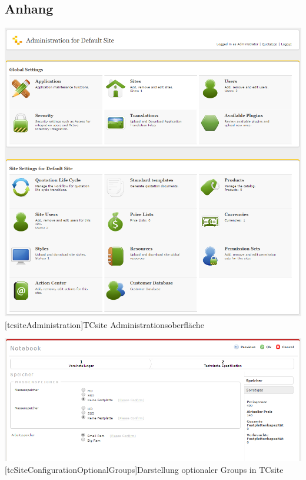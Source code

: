 
\renewcommand\refname{Anhang}
\begin{appendix}
\section{Anhang}

\vspace{1em}
\begin{minipage}{\linewidth}
	\centering
	\includegraphics[width=1\linewidth]{Abbildungen/tcsiteAdministration.PNG}
	[tcsiteAdministration]{TCsite Administrationsoberfläche}
	\label{app:tcsiteAdministration}
\end{minipage}
\vspace{1em}

\vspace{1em}
\begin{minipage}{\linewidth}
	\centering
	\includegraphics[width=1\linewidth]{Abbildungen/tcSiteConfigurationOptionalGroups.PNG}
	[tcSiteConfigurationOptionalGroups]{Darstellung optionaler Groups in TCsite}
	\label{app:tcSiteConfigurationOptionalGroups}
\end{minipage}
\vspace{1em}


\end{appendix}
